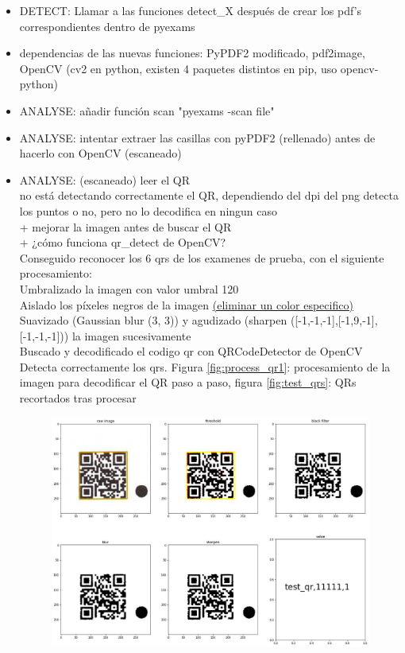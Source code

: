 \begin{itemize}
\begin{enumerate}
\begin{itemize}
            \item DETECT: Llamar a las funciones detect\_X después de crear los pdf's correspondientes dentro de pyexams
            \item dependencias de las nuevas funciones: PyPDF2 modificado, pdf2image, OpenCV (cv2 en python, existen 4 paquetes distintos en pip, uso opencv-python)
            \item ANALYSE: añadir función scan "pyexams -scan file"
            \item ANALYSE: intentar extraer las casillas con pyPDF2 (rellenado) antes de hacerlo con OpenCV (escaneado)
            \item ANALYSE: (escaneado) leer el QR \\
            no está detectando correctamente el QR, dependiendo del dpi del png detecta los puntos o no, pero no lo decodifica en ningun caso \\
            + mejorar la imagen antes de buscar el QR \\
            + ¿cómo funciona qr\_detect de OpenCV? \\
            Conseguido reconocer los 6 qrs de los examenes de prueba, con el siguiente procesamiento: \\
            Umbralizado la imagen con valor umbral 120 \\
            Aislado los píxeles negros de la imagen \href{https://stackoverflow.com/questions/42592234/python-opencv-morphologyex-remove-specific-color}{(eliminar un color especifico)} \\
            Suavizado (Gaussian blur (3, 3)) y agudizado (sharpen ([-1,-1,-1],[-1,9,-1],[-1,-1,-1])) la imagen sucesivamente \\
            Buscado y decodificado el codigo qr con QRCodeDetector de OpenCV\\
            Detecta correctamente los qrs. Figura \ref{fig:process_qr1}: procesamiento de la imagen para decodificar el QR paso a paso, figura \ref{fig:test_qrs}: QRs recortados tras procesar
            \begin{figure}
                \centering
                \includegraphics[width=\textwidth]{figures/process_qr1.png}

\end{figure}
\end{itemize}
\end{enumerate}
\end{itemize}
